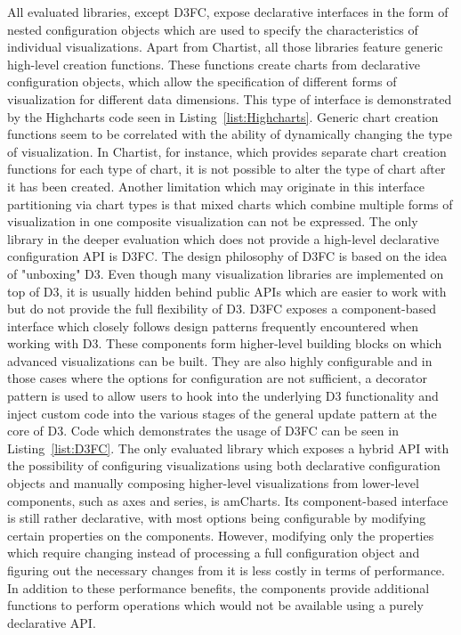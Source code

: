 All evaluated libraries, except D3FC, expose declarative interfaces in the form of nested configuration objects which are used to specify the characteristics of individual visualizations.
Apart from Chartist, all those libraries feature generic high-level creation functions. 
These functions create charts from declarative configuration objects, which allow the specification of different forms of visualization for different data dimensions.
This type of interface is demonstrated by the Highcharts code seen in Listing~\ref{list:Highcharts}.
Generic chart creation functions seem to be correlated with the ability of dynamically changing the type of visualization.
In Chartist, for instance, which provides separate chart creation functions for each type of chart, it is not possible to alter the type of chart after it has been created.
Another limitation which may originate in this interface partitioning via chart types is that mixed charts which combine multiple forms of visualization in one composite visualization can not be expressed.
The only library in the deeper evaluation which does not provide a high-level declarative configuration API is D3FC.
The design philosophy of D3FC is based on the idea of "unboxing" D3.
Even though many visualization libraries are implemented on top of D3, it is usually hidden behind public APIs which are easier to work with but do not provide the full flexibility of D3.
D3FC exposes a component-based interface which closely follows design patterns frequently encountered when working with D3. 
These components form higher-level building blocks on which advanced visualizations can be built. 
They are also highly configurable and in those cases where the options for configuration are not sufficient, a decorator pattern is used to allow users to hook into the underlying D3 functionality and inject custom code into the various stages of the general update pattern at the core of D3.
Code which demonstrates the usage of D3FC can be seen in Listing~\ref{list:D3FC}. 
The only evaluated library which exposes a hybrid API with the possibility of configuring visualizations using both declarative configuration objects and manually composing higher-level visualizations from lower-level components, such as axes and series, is amCharts.
Its component-based interface is still rather declarative, with most options being configurable by modifying certain properties on the components.
However, modifying only the properties which require changing instead of processing a full configuration object and figuring out the necessary changes from it is less costly in terms of performance. 
In addition to these performance benefits, the components provide additional functions to perform operations which would not be available using a purely declarative API.

